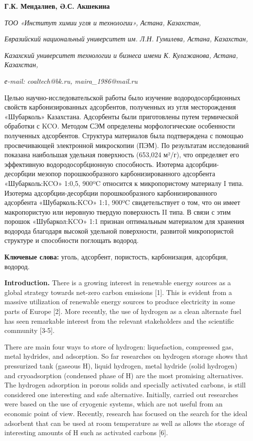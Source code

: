 {\bfseries {}Г.К. Мендалиев, Ә.С.
Акшекина}

\emph{ТОО «Институт химии угля и технологии», Астана,
Казахстан,}

\emph{Евразийский национальный университет им. Л.Н.
Гумилева, Астана, Казахстан,}

\emph{Казахский университет технологии и бизнеса
имени К. Кулажанова, Астана, Казахстан,}

\emph{е-mail: coaltech@bk.ru,
maira\_1986@mail.ru}

Целью научно-исследовательской работы было изучение водородосорбционных
свойств карбонизированных адсорбентов, полученных из угля месторождения
«Шубарколь» Казахстана. Адсорбенты были приготовлены путем термической
обработки с KCO. Методом СЭМ
определены морфологические особенности полученных адсорбентов. Структура
материалов была подтверждена с помощью просвечивающей электронной
микроскопии (ПЭМ). По результатам исследований показана наибольшая
удельная поверхность (653,024 м²/г), что определяет его эффективную
водородосорбционную способность. Изотерма адсорбции-десорбции мезопор
порошкообразного карбонизированного адсорбента
«Шубарколь:KCO» 1:0,5, 900ºC относится
к микропористому материалу I типа. Изотерма адсорбции-десорбции
порошкообразного карбонизированного адсорбента
«Шубарколь:KCO» 1:1, 900ºC
свидетельствует о том, что он имеет макропористую или неровную твердую
поверхность II типа. В связи с этим порошок
«Шубаркол:KCO» 1:1 признан оптимальным
материалом для хранения водорода благодаря высокой удельной поверхности,
развитой микропористой структуре и способности поглощать водород.

{\bfseries Ключевые слова:} уголь, адсорбент, пористость, карбонизация,
адсорбция, водород.

{\bfseries Introduction.} There is a growing interest in renewable energy
sources as a global strategy towards net-zero carbon emissions {[}1{]}.
This is evident from a massive utilization of renewable energy sources
to produce electricity in some parts of Europe {[}2{]}. More recently,
the use of hydrogen as a clean alternate fuel has seen remarkable
interest from the relevant stakeholders and the scientific community
{[}3-5{]}.

There are main four ways to store of hydrogen: liquefaction, compressed
gas, metal hydrides, and adsorption. So far researches on hydrogen
storage shows that pressurized tank (gaseous H), liquid
hydrogen, metal hydride (solid hydrogen) and cryoadsorption (condensed
phase of H) are the most promising alternatives. The
hydrogen adsorption in porous solids and specially activated carbons, is
still considered one interesting and safe alternative. Initially,
carried out researches were based on the use of cryogenic systems, which
are not useful from an economic point of view. Recently, research has
focused on the search for the ideal adsorbent that can be used at room
temperature as well as allows the storage of interesting amounts of
H such as activated carbons {[}6{]}.

